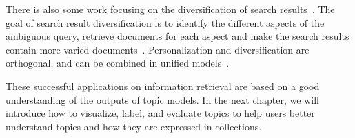 There is also some work focusing on the diversification of search
results~\citep{Dang-2013,Santos-2015}. The goal of search result
diversification is to identify the different aspects of the ambiguous
query, retrieve documents for each aspect and make the search results
contain more varied documents~\citep{Dang-2013}. Personalization and
diversification are orthogonal, and can be combined in unified
models~\citep{Vallet-2012,Liang-2014}.

These successful applications on information retrieval are based on a good
understanding of the outputs of topic models. In the next chapter, we
will introduce how to visualize, label, and evaluate topics to
help users better understand topics and how they are expressed in collections.
